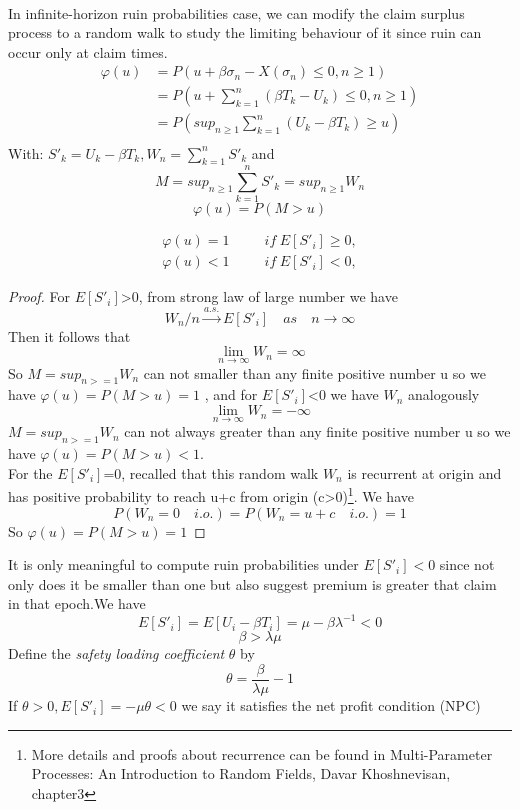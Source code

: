 \documentclass[project2.tex]{subfiles}
\begin{document}
\paragraph{}
In infinite-horizon ruin probabilities case, we can modify the claim surplus process to a random walk to study the limiting behaviour of it since ruin can occur only at claim times.
\begin{align*}
\varphi(u)&=P(u+\beta\sigma_n-X(\sigma_n)\leq 0, n\geq 1)\\
&=P(u+\sum^n_{k=1}(\beta T_k-U_k)\leq 0, n\geq 1)\\
&=P(sup_{n\geq 1}\sum^n_{k=1}(U_k-\beta T_k)\geq u)\\
\end{align*}
With: $S'_k=U_k-\beta T_k, W_n=\sum^n_{k=1}S'_k$ and $$M=sup_{n\geq 1}\sum^n_{k=1}S'_k=sup_{n\geq 1}W_n$$
$$\varphi(u)=P(M>u)$$
\begin{lemma}
\begin{align*}
\varphi(u)=1\hspace{30pt} if \hspace{3pt}  E[S'_i]\geq 0,\\
\varphi(u)<1\hspace{30pt} if \hspace{3pt}  E[S'_i]<0,
\end{align*}
\end{lemma}
\begin{proof}
For $E[S'_i]$>0, from strong law of large number we have
$$W_n/n \overset{a.s.}{\rightarrow} E[S'_i]\quad as\quad n\rightarrow\infty $$
Then it follows that
$$\lim_{n\rightarrow\infty}W_n=\infty$$ 
So $M=sup_{n>=1}W_n$ can not smaller than any finite positive number u so we have $\varphi(u)=P(M>u)=1$ , and for $E[S'_i]$<0 we have $W_n$ analogously
$$\lim_{n\rightarrow\infty}W_n=-\infty$$ 
$M=sup_{n>=1}W_n$ can not always greater than any finite positive number u so we have $\varphi(u)=P(M>u)<1$.\\
For the $E[S'_i]$=0, recalled that this random walk $W_n$ is recurrent at origin and has positive probability to reach u+c from origin (c>0)\footnote{More details and proofs about recurrence can be found in Multi-Parameter Processes:
An Introduction to Random Fields, Davar Khoshnevisan, chapter3}. We have $$P(W_n=0\quad i.o.)=P(W_n=u+c\quad i.o.)=1$$ So $\varphi(u)=P(M>u)=1$
\end{proof}
\begin{observation}It is only meaningful to compute ruin probabilities under $E[S'_i]<0$ since not only does it be smaller than one but also suggest premium is greater that claim in that epoch.We have $$E[S'_i]=E[U_i-\beta  T_i]=\mu -\beta \lambda^{-1}<0$$ $$\beta >\lambda\mu$$ 
Define the {\it safety loading coefficient} $\theta$ by
$$\theta=\frac{\beta}{\lambda\mu}-1$$If $\theta>0,E[S'_i]=-\mu\theta<0$ we say it satisfies the net profit condition (NPC)
\end{observation}
\end{document}
